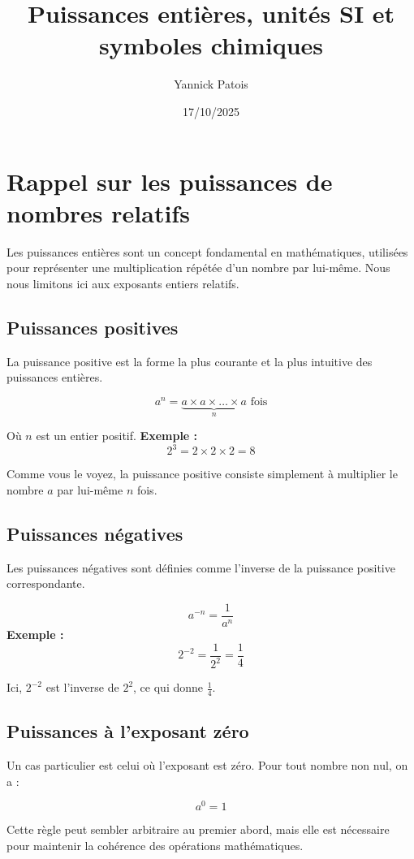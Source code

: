 \documentclass{article}
\title{Puissances entières, unités SI et symboles chimiques}
\author{Yannick Patois}
\date{17/10/2025}
\begin{document}
\maketitle

\section{Rappel sur les puissances de nombres relatifs}

Les puissances entières sont un concept fondamental en mathématiques, utilisées pour représenter une multiplication
répétée d'un nombre par lui-même. Nous nous limitons ici aux exposants entiers relatifs.

\subsection{Puissances positives}

La puissance positive est la forme la plus courante et la plus intuitive des puissances entières. 

\[
a^n = \underbrace{a \times a \times \dots \times a}_{n}  \text{ fois}
\]

Où \( n \) est un entier positif.
\vfill
\textbf{Exemple :}
\[
2^3 = 2 \times 2 \times 2 = 8
\]

Comme vous le voyez, la puissance positive consiste simplement à multiplier le nombre \( a \) par lui-même \( n \) fois.

\subsection{Puissances négatives}

Les puissances négatives sont définies comme l'inverse de la puissance positive correspondante.

\[
a^{-n} = \frac{1}{a^n}
\]
\vfill
\textbf{Exemple :}
\[
2^{-2} = \frac{1}{2^2} = \frac{1}{4}
\]

Ici, \( 2^{-2} \) est l'inverse de \( 2^2 \), ce qui donne \( \frac{1}{4} \).

\subsection{Puissances à l'exposant zéro}

Un cas particulier est celui où l'exposant est zéro. Pour tout nombre non nul, on a :

\[
a^0 = 1
\]

Cette règle peut sembler arbitraire au premier abord, mais elle est nécessaire pour maintenir
la cohérence des opérations mathématiques.
\end{document}

